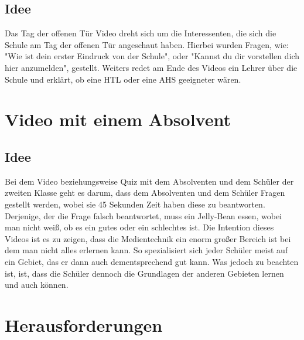 \subsection{Idee}
Das Tag der offenen Tür Video dreht sich um die Interessenten, die sich die Schule am Tag der offenen Tür angeschaut haben. Hierbei wurden Fragen, wie: "Wie ist dein erster Eindruck von der Schule", oder "Kannst du dir vorstellen dich hier anzumelden", gestellt. Weiters redet am Ende des Videos ein Lehrer über die Schule und erklärt, ob eine HTL oder eine AHS geeigneter wären.
\section{Video mit einem Absolvent}
\subsection{Idee}
Bei dem Video beziehungsweise Quiz mit dem Absolventen und dem Schüler der zweiten Klasse geht es darum, dass dem Absolventen und dem Schüler Fragen gestellt werden, wobei sie 45 Sekunden Zeit haben diese zu beantworten. Derjenige, der die Frage falsch beantwortet, muss ein Jelly-Bean essen, wobei man nicht weiß, ob es ein gutes oder ein schlechtes ist. Die Intention dieses Videos ist es zu zeigen, dass die Medientechnik ein enorm großer Bereich ist bei dem man nicht alles erlernen kann. So spezialisiert sich jeder Schüler meist auf ein Gebiet, das er dann auch dementsprechend gut kann. Was jedoch zu beachten ist, ist, dass die Schüler dennoch die Grundlagen der anderen Gebieten lernen und auch können.
\section{Herausforderungen}
